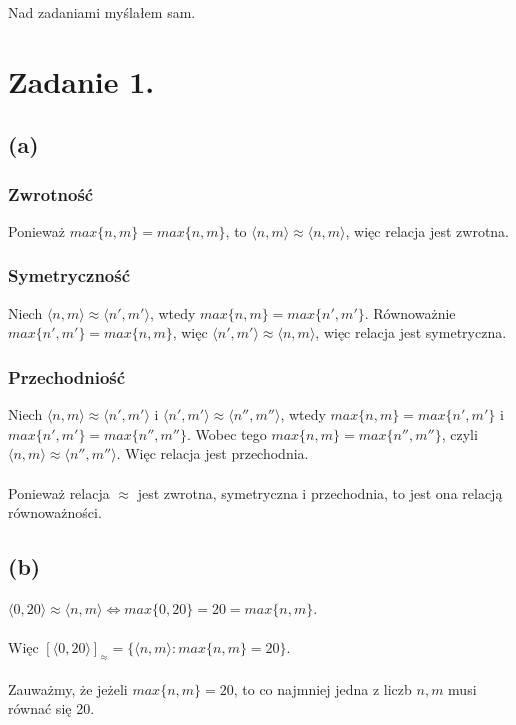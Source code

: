 \documentclass{article}
\begin{document}
\newcommand{\imp}{\Rightarrow}
\newcommand{\lub}{\vee}
\newcommand{\roz}{\setminus}
\newcommand{\zbp}{\emptyset}
\newcommand{\zbpot}{\mathcal{P}}
\newcommand{\troj}{\bigtriangleup}
\newcommand{\nat}{\mathbb{N}}
\newcommand{\calk}{\mathbb{Z}}
\newcommand{\rze}{\mathbb{R}}
\newcommand{\wegde}{\wedge}
\newcommand{\eps}{\varepsilon}
\newcommand{\con}{\mathfrak{c}}
\maketitle
Nad zadaniami myślałem sam. 
\section*{Zadanie 1.}
\subsection*{(a)}
\subsubsection*{Zwrotność}
Ponieważ $max\{n,m\} = max\{n,m\}$, to $\langle n,m \rangle \approx \langle n,m \rangle$, więc relacja jest zwrotna.
\subsubsection*{Symetryczność}
Niech $\langle n,m \rangle \approx \langle n',m' \rangle$, wtedy $max\{n,m\} = max\{n',m'\}$. 
Równoważnie $max\{n',m'\} = max\{n,m\}$, więc $\langle n',m' \rangle \approx \langle n,m \rangle$, więc relacja jest symetryczna.
\subsubsection*{Przechodniość}
Niech $\langle n,m \rangle \approx \langle n',m' \rangle$ i $\langle n',m' \rangle \approx \langle n'',m'' \rangle$, wtedy $max\{n,m\} = max\{n',m'\}$ i $max\{n',m'\} = max\{n'',m''\}$. 
Wobec tego $max\{n,m\} = max\{n'',m''\}$, czyli $\langle n,m \rangle \approx \langle n'',m'' \rangle$. Więc relacja jest przechodnia.
\\\\
Ponieważ relacja $\approx$ jest zwrotna, symetryczna i przechodnia, to jest ona relacją równoważności.

\subsection*{(b)}
$\langle 0,20 \rangle \approx \langle n,m \rangle \Leftrightarrow max\{0,20\} = 20 = max\{n,m\}$.
\\\\
Więc $[\langle 0,20 \rangle ]_{\approx} = \{\langle n,m \rangle : max\{n,m\} = 20 \}$.
\\\\
Zauważmy, że jeżeli $max\{n,m\} = 20$, to co najmniej jedna z liczb $n,m$ musi równać się 20.
\end{document}
